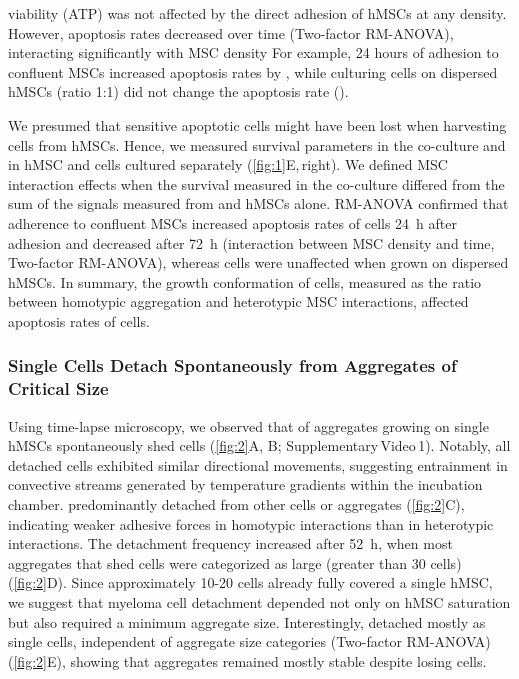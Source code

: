\vspace{-.3cm}

\INA viability (ATP) was not affected by the direct adhesion of hMSCs at any
density. However, apoptosis rates decreased over time
 (Two-factor RM-ANOVA),
interacting significantly with MSC density
 For example, 24 hours of
adhesion to confluent MSCs increased apoptosis rates by
, while culturing \INA cells on dispersed hMSCs
(ratio 1:1) did not change the apoptosis rate ().


We presumed that sensitive apoptotic cells might have been lost when harvesting
\INA cells from hMSCs. Hence, we measured survival parameters in the co-culture
and in hMSC and \INA cells cultured separately (\autoref{fig:1}E,\,right). We
defined MSC interaction effects when the survival measured in the co-culture
differed from the sum of the signals measured from \INA and hMSCs alone.
RM-ANOVA confirmed that adherence to confluent MSCs increased apoptosis rates of
\INA cells \SI{24}{\hour} after adhesion and decreased after \SI{72}{\hour}
 (interaction between MSC
density and time, Two-factor RM-ANOVA), whereas \INA cells were unaffected when
grown on dispersed hMSCs.
In summary, the growth conformation of \INA cells, measured as the ratio between
homotypic aggregation and heterotypic MSC interactions, affected apoptosis rates
of \INA cells.




\subsubsection*{Single \INA Cells Detach Spontaneously from Aggregates of Critical Size}%
\label{C1:results_timelapse}%
Using time-lapse microscopy, we observed that  of
\INA aggregates growing on single hMSCs spontaneously shed \INA cells
(\autoref{fig:2}A, B; Supplementary\,Video\,1). Notably, all detached cells
exhibited similar directional movements, suggesting entrainment in convective
streams generated by temperature gradients within the incubation chamber. \INA
predominantly detached from other \INA cells or aggregates (\autoref{fig:2}C),
indicating weaker adhesive forces in homotypic interactions than in heterotypic
interactions. The detachment frequency increased after \SI{52}{\hour}, when most
aggregates that shed \INA cells were categorized as large (greater than 30
cells) (\autoref{fig:2}D). Since approximately 10-20 \INA cells already fully
covered a single hMSC, we suggest that myeloma cell detachment depended not only
on hMSC saturation but also required a minimum aggregate size. Interestingly,
\INA detached mostly as single cells, independent of aggregate size categories
(Two-factor RM-ANOVA) (\autoref{fig:2}E),
showing that aggregates remained mostly stable despite losing cells.


